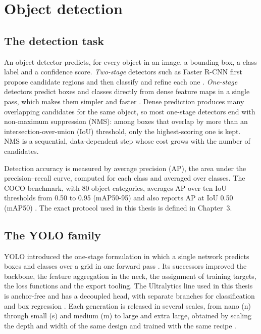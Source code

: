 \documentclass[a4paper,11pt,twoside]{report}
\theoremstyle{definition}
\begin{document}
\section{Object detection}
\label{sec:rw_detection}

\subsection{The detection task}
\label{sec:rw_detection_task}

An object detector predicts, for every object in an image, a bounding box, a class label and a confidence score. \emph{Two-stage} detectors such as Faster R-CNN first propose candidate regions and then classify and refine each one \cite{Ren2015FasterRCNN}. \emph{One-stage} detectors predict boxes and classes directly from dense feature maps in a single pass, which makes them simpler and faster \cite{Redmon2016YOLO}. Dense prediction produces many overlapping candidates for the same object, so most one-stage detectors end with non-maximum suppression (NMS): among boxes that overlap by more than an intersection-over-union (IoU) threshold, only the highest-scoring one is kept. NMS is a sequential, data-dependent step whose cost grows with the number of candidates.

Detection accuracy is measured by average precision (AP), the area under the precision--recall curve, computed for each class and averaged over classes. The COCO benchmark, with 80 object categories, averages AP over ten IoU thresholds from 0.50 to 0.95 (mAP50-95) and also reports AP at IoU 0.50 (mAP50) \cite{Lin2014COCO}. The exact protocol used in this thesis is defined in Chapter~3.

\subsection{The YOLO family}
\label{sec:rw_yolo}

YOLO introduced the one-stage formulation in which a single network predicts boxes and classes over a grid in one forward pass \cite{Redmon2016YOLO}. Its successors improved the backbone, the feature aggregation in the neck, the assignment of training targets, the loss functions and the export tooling. The Ultralytics line used in this thesis is anchor-free and has a decoupled head, with separate branches for classification and box regression \cite{UltralyticsYOLOv8, Sapkota2025YOLOEvolution}. Each generation is released in several scales, from nano (n) through small (s) and medium (m) to large and extra large, obtained by scaling the depth and width of the same design and trained with the same recipe \cite{UltralyticsYOLO11, Jocher2026YOLO26}.
\end{document}
